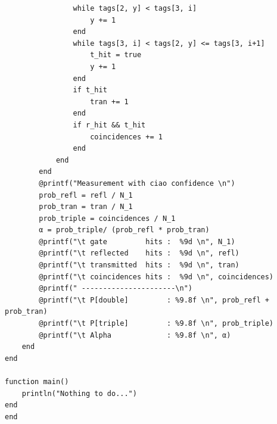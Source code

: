 \documentclass[10pt, final]{article}
\begin{document}
\begin{mdframed}
\begin{lstlisting}
                while tags[2, y] < tags[3, i]
                    y += 1
                end
                while tags[3, i] < tags[2, y] <= tags[3, i+1]
                    t_hit = true
                    y += 1
                end
                if t_hit
                    tran += 1
                end
                if r_hit && t_hit
                    coincidences += 1
                end
            end
        end
        @printf("Measurement with ciao confidence \n")
        prob_refl = refl / N_1
        prob_tran = tran / N_1
        prob_triple = coincidences / N_1
        α = prob_triple/ (prob_refl * prob_tran)
        @printf("\t gate         hits :  %9d \n", N_1)
        @printf("\t reflected    hits :  %9d \n", refl)
        @printf("\t transmitted  hits :  %9d \n", tran)
        @printf("\t coincidences hits :  %9d \n", coincidences)
        @printf(" ----------------------\n")
        @printf("\t P[double]         : %9.8f \n", prob_refl + prob_tran)
        @printf("\t P[triple]         : %9.8f \n", prob_triple)
        @printf("\t Alpha             : %9.8f \n", α)
    end
end

function main()
    println("Nothing to do...")
end
end
  \end{lstlisting}
\end{mdframed}
\end{document}
